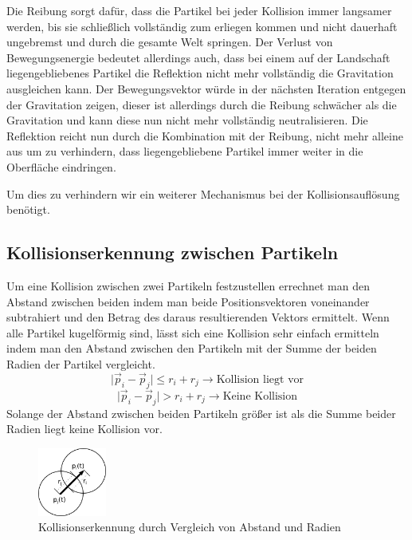 \begin{Spacing}{\mylinespace}
		Die Reibung sorgt dafür, dass die Partikel bei jeder Kollision immer langsamer
		werden, bis sie schließlich vollständig zum erliegen kommen und
		nicht dauerhaft ungebremst und durch die gesamte Welt springen.
		Der Verlust von Bewegungsenergie bedeutet allerdings auch, dass bei einem auf der
		Landschaft liegengebliebenes Partikel die Reflektion nicht mehr vollständig die
		Gravitation ausgleichen kann. Der Bewegungsvektor würde in der
		nächsten Iteration entgegen der Gravitation zeigen, dieser ist allerdings durch die Reibung
		schwächer als die Gravitation und kann diese nun nicht mehr vollständig neutralisieren. Die Reflektion
		reicht nun durch die Kombination mit der Reibung, nicht mehr alleine aus
		um zu verhindern, dass liegengebliebene Partikel immer weiter in die Oberfläche eindringen.

		Um dies zu verhindern wir ein weiterer Mechanismus bei der Kollisionsauflösung benötigt.



    \subsection{Kollisionserkennung zwischen Partikeln} \label{kollpart}
    	Um eine Kollision zwischen zwei Partikeln festzustellen errechnet man
    	den Abstand zwischen beiden indem man beide Positionsvektoren voneinander
    	subtrahiert und den Betrag des daraus resultierenden Vektors ermittelt.
    	Wenn alle Partikel kugelförmig sind,
    	lässt sich eine Kollision sehr einfach ermitteln indem man den Abstand
    	zwischen den Partikeln mit der Summe der beiden Radien der Partikel vergleicht.
    	\[ \vert \vec{p}_{i} - \vec{p}_{j} \vert \leq r_{i} + r_{j} \rightarrow \textrm{Kollision liegt vor} \]
    	\[ \vert \vec{p}_{i} - \vec{p}_{j} \vert > r_{i} + r_{j} \rightarrow \textrm{Keine Kollision} \]
    	Solange der Abstand zwischen beiden Partikeln größer ist als die Summe beider Radien
    	 liegt keine Kollision vor.
    	 \begin{figure}[h!]
			\centering
			\vspace*{30px}
			\includegraphics[width=0.2\textwidth]{graphics/Phys_kp.png}
			\caption{Kollisionserkennung durch Vergleich von Abstand und Radien}
			\label{fig:partkoll}
		\end{figure}		
		

\end{Spacing}
